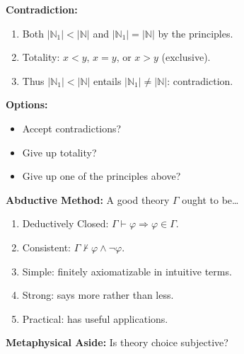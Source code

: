 \documentclass[handout]{beamer}
\newcommand{\abs}[1]{|#1|} %
\newcommand{\N}{\mathbb{N}}
\begin{document}

\begin{frame}

  \textbf{Contradiction:}

    \begin{enumerate}
      \item Both $\abs{\N_1}<\abs{\N}$ and $\abs{\N_1}=\abs{\N}$ by the principles.
      \item Totality: $x < y$, $x = y$, or $x > y$ (exclusive).
      \item Thus $\abs{\N_1}<\abs{\N}$ entails $\abs{\N_1} \neq \abs{\N}$: contradiction.
    \end{enumerate}
    \vspace{.2in}
    \pause

  \textbf{Options:}

    \begin{itemize}
      \item Accept contradictions?
      \item Give up totality?
      \item Give up one of the principles above?
    \end{itemize}

\end{frame}


\begin{frame}

  \textbf{Abductive Method:} A good theory $\Gamma$ ought to be\ldots 

  \begin{enumerate}
    \item Deductively Closed: $\Gamma \vdash \varphi \Rightarrow \varphi \in \Gamma$.
    \item Consistent: $\Gamma\nvdash \varphi\wedge\neg\varphi$.
    \item Simple: finitely axiomatizable in intuitive terms.
    \item Strong: says more rather than less.
    \item Practical: has useful applications.
  \end{enumerate}
  \vspace{.2in}
  \pause

  \textbf{Metaphysical Aside:} Is theory choice subjective?

\end{frame}
\end{document}
